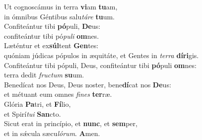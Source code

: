 \evenverse Ut cognoscámus in terra \textbf{vi}am \textbf{tu}am,~\*\\
\evenverse in ómnibus Géntibus salu\textit{tá}\textit{re} \textbf{tu}um.\\
\oddverse Confiteántur tibi \textbf{pó}puli, \textbf{De}us:~\*\\
\oddverse confiteántur tibi pó\textit{pu}\textit{li} \textbf{om}nes.\\
\evenverse Læténtur et ex\textbf{súl}tent \textbf{Gen}tes:~\*\\
\evenverse quóniam júdicas pópulos in æquitáte, et Gentes in \textit{ter}\textit{ra} \textbf{dí}\textbf{ri}gis.\\
\oddverse Confiteántur tibi pópuli, Deus, confiteántur tibi \textbf{pó}puli \textbf{om}nes:~\*\\
\oddverse terra dedit \textit{fru}\textit{ctum} \textbf{su}um.\\
\evenverse Benedícat nos Deus, Deus noster, bene\textbf{dí}cat nos \textbf{De}us:~\*\\
\evenverse et métuant eum omnes \textit{fi}\textit{nes} \textbf{ter}ræ.\\
\oddverse Glória \textbf{Pa}tri, et \textbf{Fí}lio,~\*\\
\oddverse et Spirí\textit{tu}\textit{i} \textbf{San}cto.\\
\evenverse Sicut erat in princípio, et \textbf{nunc}, et \textbf{sem}per,~\*\\
\evenverse et in sǽcula sæcu\textit{ló}\textit{rum}. \textbf{A}men.\\
